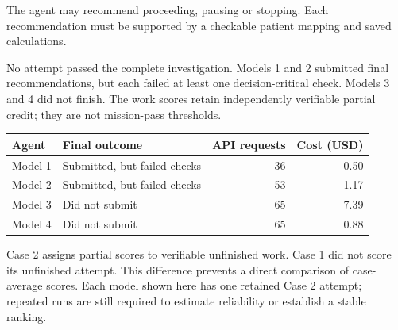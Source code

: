 The agent may recommend proceeding, pausing or stopping. Each recommendation must be supported by a checkable patient mapping and saved calculations.

\newpage
{}
\begin{center}
\end{center}

No attempt passed the complete investigation. Models 1 and 2 submitted final recommendations, but each failed at least one decision-critical check. Models 3 and 4 did not finish. The work scores retain independently verifiable partial credit; they are not mission-pass thresholds.

\begin{tabularx}{\textwidth}{@{}Ylrr@{}}\toprule
Agent & Final outcome & API requests & Cost (USD) \\\midrule
Model 1 & Submitted, but failed checks & 36 & 0.50 \\
Model 2 & Submitted, but failed checks & 53 & 1.17 \\
Model 3 & Did not submit & 65 & 7.39 \\
Model 4 & Did not submit & 65 & 0.88 \\\bottomrule
\end{tabularx}

Case 2 assigns partial scores to verifiable unfinished work. Case 1 did not score its unfinished attempt. This difference prevents a direct comparison of case-average scores. Each model shown here has one retained Case 2 attempt; repeated runs are still required to estimate reliability or establish a stable ranking.

